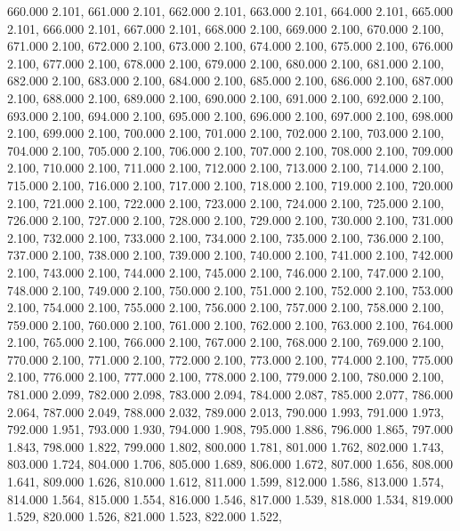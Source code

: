 660.000 2.101, 
661.000 2.101, 
662.000 2.101, 
663.000 2.101, 
664.000 2.101, 
665.000 2.101, 
666.000 2.101, 
667.000 2.101, 
668.000 2.100, 
669.000 2.100, 
670.000 2.100, 
671.000 2.100, 
672.000 2.100, 
673.000 2.100, 
674.000 2.100, 
675.000 2.100, 
676.000 2.100, 
677.000 2.100, 
678.000 2.100, 
679.000 2.100, 
680.000 2.100, 
681.000 2.100, 
682.000 2.100, 
683.000 2.100, 
684.000 2.100, 
685.000 2.100, 
686.000 2.100, 
687.000 2.100, 
688.000 2.100, 
689.000 2.100, 
690.000 2.100, 
691.000 2.100, 
692.000 2.100, 
693.000 2.100, 
694.000 2.100, 
695.000 2.100, 
696.000 2.100, 
697.000 2.100, 
698.000 2.100, 
699.000 2.100, 
700.000 2.100, 
701.000 2.100, 
702.000 2.100, 
703.000 2.100, 
704.000 2.100, 
705.000 2.100, 
706.000 2.100, 
707.000 2.100, 
708.000 2.100, 
709.000 2.100, 
710.000 2.100, 
711.000 2.100, 
712.000 2.100, 
713.000 2.100, 
714.000 2.100, 
715.000 2.100, 
716.000 2.100, 
717.000 2.100, 
718.000 2.100, 
719.000 2.100, 
720.000 2.100, 
721.000 2.100, 
722.000 2.100, 
723.000 2.100, 
724.000 2.100, 
725.000 2.100, 
726.000 2.100, 
727.000 2.100, 
728.000 2.100, 
729.000 2.100, 
730.000 2.100, 
731.000 2.100, 
732.000 2.100, 
733.000 2.100, 
734.000 2.100, 
735.000 2.100, 
736.000 2.100, 
737.000 2.100, 
738.000 2.100, 
739.000 2.100, 
740.000 2.100, 
741.000 2.100, 
742.000 2.100, 
743.000 2.100, 
744.000 2.100, 
745.000 2.100, 
746.000 2.100, 
747.000 2.100, 
748.000 2.100, 
749.000 2.100, 
750.000 2.100, 
751.000 2.100, 
752.000 2.100, 
753.000 2.100, 
754.000 2.100, 
755.000 2.100, 
756.000 2.100, 
757.000 2.100, 
758.000 2.100, 
759.000 2.100, 
760.000 2.100, 
761.000 2.100, 
762.000 2.100, 
763.000 2.100, 
764.000 2.100, 
765.000 2.100, 
766.000 2.100, 
767.000 2.100, 
768.000 2.100, 
769.000 2.100, 
770.000 2.100, 
771.000 2.100, 
772.000 2.100, 
773.000 2.100, 
774.000 2.100, 
775.000 2.100, 
776.000 2.100, 
777.000 2.100, 
778.000 2.100, 
779.000 2.100, 
780.000 2.100, 
781.000 2.099, 
782.000 2.098, 
783.000 2.094, 
784.000 2.087, 
785.000 2.077, 
786.000 2.064, 
787.000 2.049, 
788.000 2.032, 
789.000 2.013, 
790.000 1.993, 
791.000 1.973, 
792.000 1.951, 
793.000 1.930, 
794.000 1.908, 
795.000 1.886, 
796.000 1.865, 
797.000 1.843, 
798.000 1.822, 
799.000 1.802, 
800.000 1.781, 
801.000 1.762, 
802.000 1.743, 
803.000 1.724, 
804.000 1.706, 
805.000 1.689, 
806.000 1.672, 
807.000 1.656, 
808.000 1.641, 
809.000 1.626, 
810.000 1.612, 
811.000 1.599, 
812.000 1.586, 
813.000 1.574, 
814.000 1.564, 
815.000 1.554, 
816.000 1.546, 
817.000 1.539, 
818.000 1.534, 
819.000 1.529, 
820.000 1.526, 
821.000 1.523, 
822.000 1.522, 

